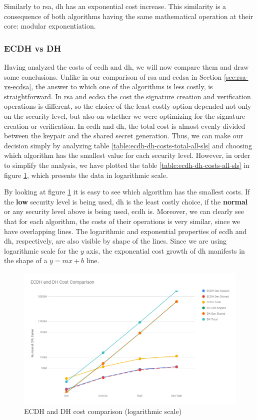 Similarly to \gls{rsa}, \gls{dh} has an exponential cost increase. This similarity is a consequence of both algorithms having the same mathematical
operation at their core: modular exponentiation.

\subsubsection{ECDH vs DH}

Having analyzed the costs of \gls{ecdh} and \gls{dh}, we will now compare them and draw some conclusions. Unlike in our comparison of
\gls{rsa} and \gls{ecdsa} in Section \ref{sec:rsa-vs-ecdsa}, the answer to which one of the algorithms is less costly, is straightforward.
In \gls{rsa} and \gls{ecdsa} the cost the signature creation and verification operations is different, so the choice of the least costly
option depended not only on the security level, but also on whether we were optimizing for the signature creation or verification. In \gls{ecdh} and \gls{dh},
the total cost is almost evenly divided between the keypair and the shared secret generation. Thus, we can make our decision simply
by analyzing table \ref{table:ecdh-dh-costs-total-all-sls} and choosing which algorithm has the smallest value for each security level.
However, in order to simplify the analysis, we have plotted the table \ref{table:ecdh-dh-costs-all-sls} in figure \ref{fig:ecdh-dh-costs-all}, which
presents the data in logarithmic scale.

By looking at figure \ref{fig:ecdh-dh-costs-all} it is easy to see which algorithm has the smallest costs. If the \textbf{low} security level is being used,
\gls{dh} is the least costly choice, if the \textbf{normal} or any security level above is being used, \gls{ecdh} is. Moreover, we can clearly see that
for each algorithm, the costs of their operations is very similar, since we have overlapping lines. The logarithmic and exponential properties of
\gls{ecdh} and \gls{dh}, respectively, are also visible by shape of the lines. Since we are using logarithmic scale for the $y$ axis, the
exponential cost growth of \gls{dh} manifests in the shape of a $y=mx+b$ line.

\begin{figure}
  \centering
  \includegraphics[width=1.0\textwidth]{img/ecdh_dh_costs_all.png}
  \centering \caption{\label{fig:ecdh-dh-costs-all} ECDH and DH cost comparison (logarithmic scale)}
\end{figure}

